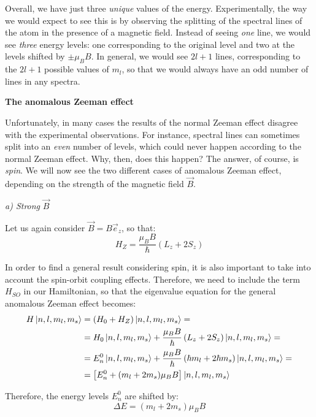 Overall, we have just three \textit{unique} values of the energy. Experimentally, the way we would expect to see this is by observing the splitting of the spectral lines of the atom in the presence of a magnetic field. Instead of seeing \textit{one} line, we would see \textit{three} energy levels: one corresponding to the original level and two at the levels shifted by $\pm \mu_B B$. In general, we would see $2l+1$ lines, corresponding to the $2l+1$ possible values of $m_l$, so that we would always have an odd number of lines in any spectra.


\textbf{The anomalous Zeeman effect}

Unfortunately, in many cases the results of the normal Zeeman effect disagree with the experimental observations. For instance, spectral lines can sometimes split into an \textit{even} number of levels, which could never happen according to the normal Zeeman effect. Why, then, does this happen? The answer, of course, is \textit{spin}. We will now see the two different cases of anomalous Zeeman effect, depending on the strength of the magnetic field $\vec{B}$.

\textit{a) Strong} $\vec{B}$

Let us again consider $\vec{B} = B\vec{e}_z$, so that:
\begin{equation}
    H_Z = \frac{\mu_B B}{\hbar}\left(L_z+2S_z\right)
\end{equation}

In order to find a general result considering spin, it is also important to take into account the spin-orbit coupling effects. Therefore, we need to include the term $H_{SO}$ in our Hamiltonian, so that the eigenvalue equation for the general anomalous Zeeman effect becomes:
\begin{equation}
    \begin{split}
        H\ket{n,l,m_l,m_s} &= (H_0+H_Z)\ket{n,l,m_l,m_s} = \\
        &= H_0\ket{n,l,m_l,m_s}+\frac{\mu_B B}{\hbar}\left(L_z+2S_z\right)\ket{n,l,m_l,m_s} = \\
        &= E_n^0\ket{n,l,m_l,m_s} + \frac{\mu_B B}{\hbar}\left(\hbar m_l+2\hbar m_s\right)\ket{n,l,m_l,m_s} = \\
        &= \left[E_n^0+  (m_l+2m_s)\mu_B B\right] \ket{n,l,m_l,m_s}
    \end{split}
\end{equation}

Therefore, the energy levels $E_n^0$ are shifted by:
\begin{equation}
    \Delta E = (m_l+2m_s)\mu_B B 
\end{equation}

